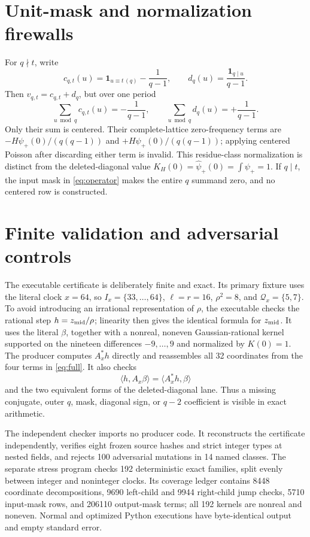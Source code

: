\documentclass[10pt]{article}
\newcommand{\one}{\mathbf 1}
\newcommand{\ip}[2]{\langle #1,#2\rangle}
\newcommand{\zm}{z_{\rm mid}}
\newcommand{\Ax}{A_x}
\newcommand{\Qx}{\mathcal Q_x}
\begin{document}
\section{Unit-mask and normalization firewalls}

For $q\nmid t$, write
\begin{equation}
 c_{q,t}(u)=\one_{u\equiv t\,(q)}-\frac1{q-1},\qquad
 d_q(u)=\frac{\one_{q\mid u}}{q-1}.                              \label{eq:cd}
\end{equation}
Then $v_{q,t}=c_{q,t}+d_q$, but over one period
\begin{equation}
 \sum_{u\bmod q}c_{q,t}(u)=-\frac1{q-1},\qquad
 \sum_{u\bmod q}d_q(u)=+\frac1{q-1}.                            \label{eq:modes}
\end{equation}
Only their sum is centered.  Their complete-lattice zero-frequency terms are
$-H\psi_+(0)/(q(q-1))$ and $+H\psi_+(0)/(q(q-1))$; applying centered
Poisson after discarding either term is invalid.  This residue-class
normalization is distinct from the deleted-diagonal value
$K_H(0)=\widehat\psi_+(0)=\int\psi_+=1$.  If $q\mid t$, the input mask in
\eqref{eq:operator} makes the entire $q$ summand zero, and no centered row is
constructed.

\section{Finite validation and adversarial controls}

The executable certificate is deliberately finite and exact.  Its primary
fixture uses the literal clock $x=64$, so $I_x=\{33,\ldots,64\}$,
$\ell=r=16$, $\rho^2=8$, and $\Qx=\{5,7\}$.  To avoid introducing an
irrational representation of $\rho$, the executable checks the rational step
$h=\zm/\rho$; linearity then gives the identical formula for $\zm$.  It uses
the literal $\beta$, together with a nonreal, noneven Gaussian-rational kernel
supported on the nineteen differences $-9,\ldots,9$ and normalized by
$K(0)=1$.  The producer computes $\Ax^*h$ directly and reassembles all 32
coordinates from the four terms in \eqref{eq:full}.  It also checks
\[
 \ip h{\Ax\beta}=\ip{\Ax^*h}{\beta}
\]
and the two equivalent forms of the deleted-diagonal lane.  Thus a missing
conjugate, outer $q$, mask, diagonal sign, or $q-2$ coefficient is visible in
exact arithmetic.

The independent checker imports no producer code.  It reconstructs the
certificate independently, verifies eight frozen source hashes and strict
integer types at nested fields, and rejects 100 adversarial mutations in 14
named classes.  The separate stress program checks 192 deterministic exact
families, split evenly between integer and noninteger clocks.  Its coverage
ledger contains 8448 coordinate decompositions, 9690 left-child and 9944
right-child jump checks, 5710 input-mask rows, and 206110 output-mask terms;
all 192 kernels are nonreal and noneven.  Normal and optimized Python
executions have byte-identical output and empty standard error.
\end{document}

